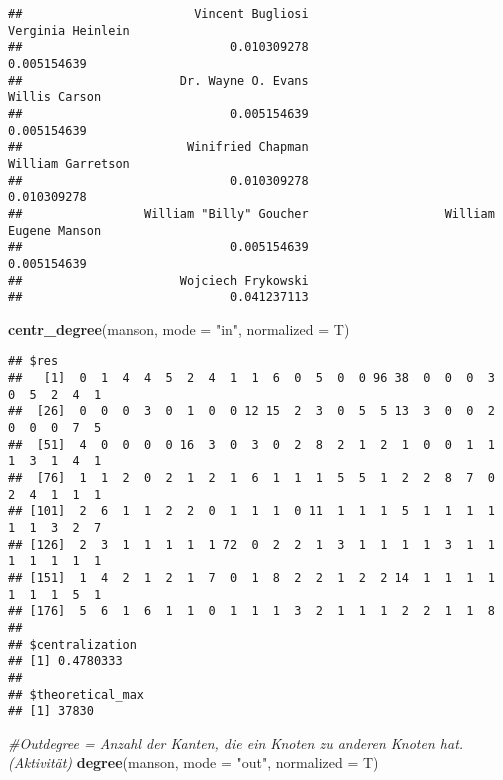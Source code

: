 \documentclass[
]{article}
\newenvironment{Shaded}{\begin{snugshade}}{\end{snugshade}}
\newcommand{\CommentTok}[1]{\textcolor[rgb]{0.56,0.35,0.01}{\textit{#1}}}
\newcommand{\DataTypeTok}[1]{\textcolor[rgb]{0.13,0.29,0.53}{#1}}
\newcommand{\KeywordTok}[1]{\textcolor[rgb]{0.13,0.29,0.53}{\textbf{#1}}}
\newcommand{\NormalTok}[1]{#1}
\newcommand{\StringTok}[1]{\textcolor[rgb]{0.31,0.60,0.02}{#1}}
\begin{document}
\begin{verbatim}
##                        Vincent Bugliosi                       Verginia Heinlein 
##                             0.010309278                             0.005154639 
##                      Dr. Wayne O. Evans                           Willis Carson 
##                             0.005154639                             0.005154639 
##                       Winifried Chapman                       William Garretson 
##                             0.010309278                             0.010309278 
##                 William "Billy" Goucher                   William Eugene Manson 
##                             0.005154639                             0.005154639 
##                      Wojciech Frykowski 
##                             0.041237113
\end{verbatim}

\begin{Shaded}
\begin{Highlighting}[]
\KeywordTok{centr_degree}\NormalTok{(manson, }\DataTypeTok{mode =} \StringTok{"in"}\NormalTok{, }\DataTypeTok{normalized =}\NormalTok{ T)}
\end{Highlighting}
\end{Shaded}

\begin{verbatim}
## $res
##   [1]  0  1  4  4  5  2  4  1  1  6  0  5  0  0 96 38  0  0  0  3  0  5  2  4  1
##  [26]  0  0  0  3  0  1  0  0 12 15  2  3  0  5  5 13  3  0  0  2  0  0  0  7  5
##  [51]  4  0  0  0  0 16  3  0  3  0  2  8  2  1  2  1  0  0  1  1  1  3  1  4  1
##  [76]  1  1  2  0  2  1  2  1  6  1  1  1  5  5  1  2  2  8  7  0  2  4  1  1  1
## [101]  2  6  1  1  2  2  0  1  1  1  0 11  1  1  1  5  1  1  1  1  1  1  3  2  7
## [126]  2  3  1  1  1  1  1 72  0  2  2  1  3  1  1  1  1  3  1  1  1  1  1  1  1
## [151]  1  4  2  1  2  1  7  0  1  8  2  2  1  2  2 14  1  1  1  1  1  1  1  5  1
## [176]  5  6  1  6  1  1  0  1  1  1  3  2  1  1  1  2  2  1  1  8
## 
## $centralization
## [1] 0.4780333
## 
## $theoretical_max
## [1] 37830
\end{verbatim}

\begin{Shaded}
\begin{Highlighting}[]
\CommentTok{#Outdegree = Anzahl der Kanten, die ein Knoten zu anderen Knoten hat. (Aktivität)}
\KeywordTok{degree}\NormalTok{(manson, }\DataTypeTok{mode =} \StringTok{"out"}\NormalTok{, }\DataTypeTok{normalized =}\NormalTok{ T)}
\end{Highlighting}
\end{Shaded}
\end{document}

